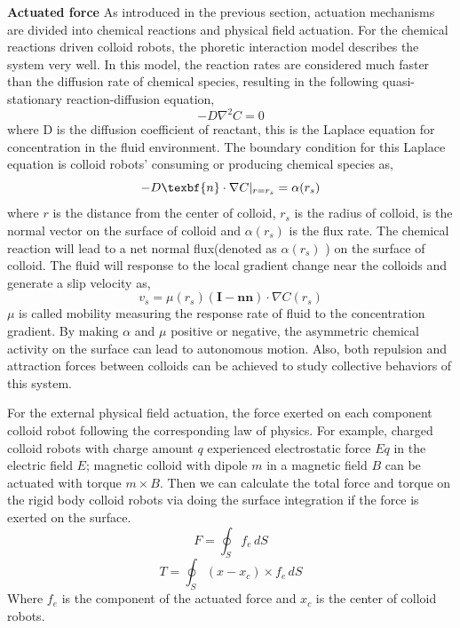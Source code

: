 \textbf{Actuated force} As introduced in the previous section, actuation mechanisms are divided into chemical reactions and physical field actuation. For the chemical reactions driven colloid robots, the phoretic interaction  model describes the system very well. \cite{golestanian2007,najafi2004simple,golestanian2005propulsion,golestanian2019phoretic} In this model, the reaction rates are considered much faster than the diffusion rate of chemical species, resulting in the following   
quasi-stationary reaction-diffusion equation,
\begin{equation}
    -D\nabla^2 C=0
\end{equation}
where D is the diffusion coefficient of reactant, this is the Laplace equation for concentration in the fluid environment. The boundary condition for this Laplace equation is  colloid robots' consuming or producing chemical species as,
\begin{equation}
    -D \texbf{n}\cdot \nabla C|_{r=r_s}=\alpha(r_s)
\end{equation}
where $r$ is the distance from the center of colloid, $r_s$ is the radius of colloid,  is the normal vector on the surface of colloid and $\alpha(r_s)$ is the flux rate. The chemical reaction will lead to a net normal flux(denoted as $\alpha(r_s)$ ) on the surface of colloid. The fluid will response to the local gradient change near the colloids and generate a slip velocity as,
\begin{equation}
    v_s=\mu(r_s)(\textbf{I}-\textbf{n}\textbf{n})\cdot \nabla C(r_s)
\end{equation}
$\mu$ is called mobility measuring the response rate of fluid to the concentration gradient. By making $\alpha$ and $\mu$ positive or negative, the asymmetric chemical activity on the surface can lead to autonomous motion.  Also, both repulsion and attraction forces between colloids can be achieved to study collective behaviors of this system. \cite{michelin2015autophoretic}

For the external physical field actuation, the force exerted on each component colloid robot following the corresponding law of physics. For example, charged colloid robots with charge amount $q$ experienced electrostatic force $Eq$ in the electric field $E$; magnetic colloid with dipole $m$ in a magnetic field $B$ can be actuated with torque $m\times B$.
Then we can calculate the total force and torque on the rigid body colloid robots via doing the surface integration if the force is exerted on the surface.
\begin{equation}
    F=\oint_S f_e \,dS
\end{equation}
\begin{equation}
    T=\oint_S (x-x_c)\times f_e \,dS
\end{equation}
Where $f_e$  is the component of the actuated force and $x_c$ is the center of colloid robots.

